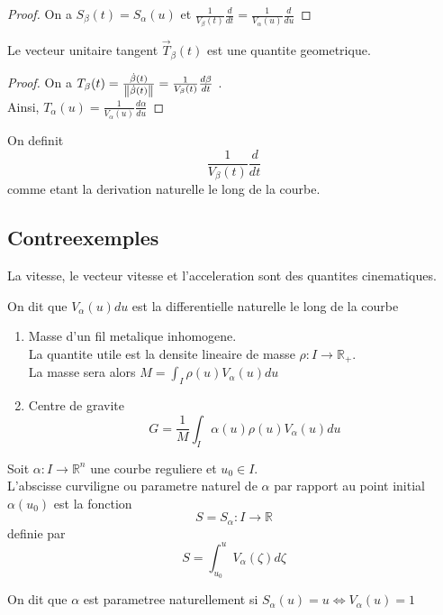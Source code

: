 \documentclass[../main.tex]{subfiles}
\begin{document}
\begin{proof}
	On a $S_{\beta} ( t) = S_{\alpha} ( u) $ et $ \frac{1}{V_{\beta} ( t) } \frac{d}{dt}= \frac{1}{V_{\alpha} ( u) } \frac{d}{du}$ 
\end{proof}
\begin{exemple}
	Le vecteur unitaire tangent $ \vec{T}_{\beta} ( t) $ est une quantite geometrique.	
\end{exemple}
\begin{proof}
	On a $T_{\beta} ( t) = \frac{ \dot { \beta} ( t) }{\left\lVert \dot{ \beta }( t) \right\rVert } =\frac{1}{V_{\beta} ( t) } \frac{d\beta}{dt}$ .\\
	Ainsi, $T_{\alpha} ( u) = \frac{1}{V_{\alpha} ( u) } \frac{d \alpha}{du}$ 
\end{proof}
\begin{defn}
	On definit 
	\[ 
		\frac{1}{V_{\beta} ( t) } \frac{d}{dt}
	\]
	comme etant la derivation naturelle le long de la courbe.
\end{defn}
\subsection*{Contreexemples}
La vitesse, le vecteur vitesse et l'acceleration sont des quantites cinematiques.
\begin{defn}
	On dit que $ V_{\alpha} ( u) du$ est la differentielle naturelle le long de la courbe
\end{defn}
\begin{exemple}
\begin{enumerate}
\item Masse d'un fil metalique inhomogene.\\
	La quantite utile est la densite lineaire de masse $\rho : I \to \mathbb{R}_+ $.\\
	La masse sera alors $M = \int_I \rho( u) V_{\alpha} ( u) du$ 
\item Centre de gravite\\
	\[ 
		G=  \frac{1}{M}\int_I \alpha( u) \rho( u)  V_{\alpha} ( u) du
	\]
	
\end{enumerate}

\end{exemple}
\begin{defn}
	Soit $\alpha: I \to \mathbb{R}^n$ une courbe reguliere et $u_0 \in I$.\\
	L'abscisse curviligne ou parametre naturel de $\alpha$ par rapport au point initial $\alpha( u_0) $ est la fonction
	\[ 
	S = S_{\alpha} : I \to \mathbb{R} 	
	\]
	definie par 
	\[ 
		S= \int_{ u_0 }^{ u } V_{\alpha} ( \zeta) d\zeta
	\]
	
\end{defn}
On dit que $\alpha$ est parametree naturellement si $S_{\alpha} ( u) =u \iff V_{\alpha} ( u) = 1$ 
\end{document}
